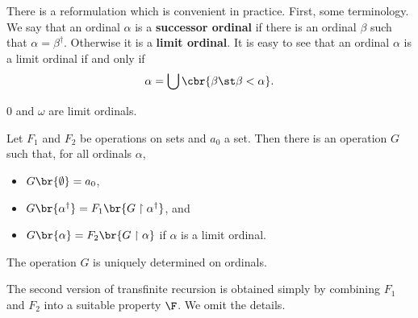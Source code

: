 There is a reformulation which is convenient in practice. First, some terminology. We say that an ordinal $ \alpha $ is a \textbf{successor ordinal} if there is an ordinal $ \beta $ such that $ \alpha = \beta^\dagger $. Otherwise it is a \textbf{limit ordinal}. It is easy to see that an ordinal $ \alpha $ is a limit ordinal if and only if
$$ \alpha = \bigcup \cbr{\beta \st \beta < \alpha}. $$

\begin{example*}
$ 0 $ and $ \omega $ are limit ordinals.
\end{example*}

\begin{theorem}
Let $ F_1 $ and $ F_2 $ be operations on sets and $ a_0 $ a set. Then there is an operation $ G $ such that, for all ordinals $ \alpha $,
\begin{itemize}
\item $ G\br{\emptyset} = a_0 $,
\item $ G\br{\alpha^\dagger} = F_1\br{G \upharpoonright \alpha^\dagger} $, and
\item $ G\br{\alpha} = F_2\br{G \upharpoonright \alpha} $ if $ \alpha $ is a limit ordinal.
\end{itemize}
The operation $ G $ is uniquely determined on ordinals.
\end{theorem}

The second version of transfinite recursion is obtained simply by combining $ F_1 $ and $ F_2 $ into a suitable property $ \F $. We omit the details.

